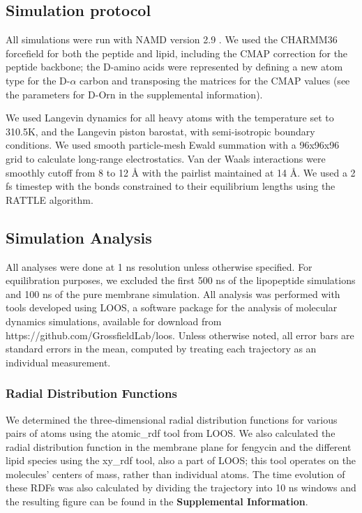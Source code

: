 \subsection{Simulation protocol}
\label{ss:ch2_sim_proto}

All simulations were run with NAMD version 2.9 \cite{Schulten2005}. We used the
CHARMM36 forcefield for both the peptide and lipid, including the CMAP
correction for the peptide backbone; the D-amino acids were
represented by defining a new atom type for the D-$\alpha$ carbon and
transposing the matrices for the CMAP values (see the parameters for D-Orn in
the supplemental information).\cite{Grossfield2013,MacKerell2013,Pastor2010}

We used Langevin dynamics for all heavy atoms with the temperature set to
310.5K, and the Langevin piston barostat, with semi-isotropic
boundary conditions.\cite{Stoll1978,Brooks1995,Klein1994} We used smooth particle-mesh Ewald summation with a
96x96x96 grid to calculate long-range electrostatics.\cite{Ewald1921} Van der Waals interactions
were smoothly cutoff from 8 to 12 {\AA} with the pairlist maintained at 14 {\AA}.
We used a 2 fs timestep with the bonds constrained to their equilibrium lengths
using the RATTLE algorithm.\cite{Andersen1983}

\subsection{Simulation Analysis}
\label{ss:ch2_sim_ana}

All analyses were done at 1 ns resolution unless otherwise specified.  For
equilibration purposes, we excluded the first 500 ns of the lipopeptide
simulations and 100 ns of the pure membrane simulation. All
analysis was performed with tools developed using LOOS, a software package for the analysis of molecular dynamics simulations,
 available for download from https://github.com/GrossfieldLab/loos.\cite{Grossfield2014,Grossfield2009}
Unless otherwise noted, all error bars are standard errors in the mean, computed by treating each trajectory as an individual measurement.

\subsubsection{Radial Distribution Functions}
\label{sss:ch2_rdf}
We determined the three-dimensional radial distribution functions for various pairs of atoms using the
atomic\_rdf tool from LOOS.\cite{Grossfield2014,Grossfield2009} We also
calculated the radial distribution function in the membrane plane for fengycin
and the different lipid species using the xy\_rdf tool, also a part of LOOS; this tool operates on the molecules' centers of mass, rather
than individual atoms. The time evolution of these RDFs was also calculated by
dividing the trajectory into 10 ns windows and the resulting figure can be found in the \textbf{Supplemental Information}.

